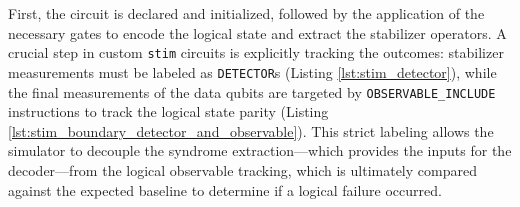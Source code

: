  First, the circuit is declared and initialized, followed by the application of the necessary gates to encode the logical state and extract the stabilizer operators. A crucial step in custom \texttt{stim} circuits is explicitly tracking the outcomes: stabilizer measurements must be labeled as \texttt{DETECTOR}s (Listing \ref{lst:stim_detector}), while the final measurements of the data qubits are targeted by \texttt{OBSERVABLE\_INCLUDE} instructions to track the logical state parity (Listing \ref{lst:stim_boundary_detector_and_observable}). This strict labeling allows the simulator to decouple the syndrome extraction—which provides the inputs for the decoder—from the logical observable tracking, which is ultimately compared against the expected baseline to determine if a logical failure occurred.

